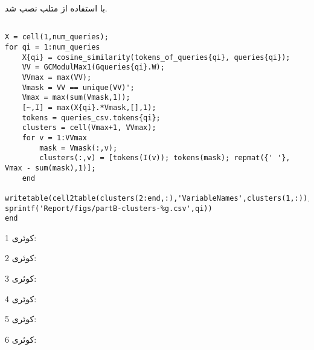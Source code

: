 \subsection{} %
با استفاده از  متلب نصب شد.

\subsection{} %

\begin{latin}
\begin{lstlisting}
X = cell(1,num_queries);
for qi = 1:num_queries
	X{qi} = cosine_similarity(tokens_of_queries{qi}, queries{qi});
	VV = GCModulMax1(Gqueries{qi}.W);
	VVmax = max(VV);
	Vmask = VV == unique(VV)';
	Vmax = max(sum(Vmask,1));
	[~,I] = max(X{qi}.*Vmask,[],1);
	tokens = queries_csv.tokens{qi};
	clusters = cell(Vmax+1, VVmax);
	for v = 1:VVmax
		mask = Vmask(:,v);
		clusters(:,v) = [tokens(I(v)); tokens(mask); repmat({' '}, Vmax - sum(mask),1)];
	end
	writetable(cell2table(clusters(2:end,:),'VariableNames',clusters(1,:)), sprintf('Report/figs/partB-clusters-%g.csv',qi))
end
\end{lstlisting}
\end{latin}


کوئری 1:
\newline{}

\newline\newline کوئری 2:
\newline{}

\newline\newline کوئری 3:
\newline{}

\newline\newline کوئری 4:
\newline{}

\newline\newline کوئری 5:
\newline{}

\newline\newline کوئری 6:
\newline{}

